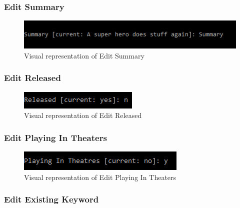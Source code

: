 \documentclass[
  english,
  a4paper,
,tablecaptionabove
]{scrartcl}
\begin{document}
\newpage

\hypertarget{edit-summary}{%
\subsubsection{Edit Summary}\label{edit-summary}}

\begin{figure}
\centering
\includegraphics{images/ui-screenshots/update-summary.png}
\caption{Visual representation of Edit Summary}
\end{figure}

\newpage

\hypertarget{edit-released}{%
\subsubsection{Edit Released}\label{edit-released}}

\begin{figure}
\centering
\includegraphics{images/ui-screenshots/update-released.png}
\caption{Visual representation of Edit Released}
\end{figure}

\newpage

\hypertarget{edit-playing-in-theaters}{%
\subsubsection{Edit Playing In
Theaters}\label{edit-playing-in-theaters}}

\begin{figure}
\centering
\includegraphics{images/ui-screenshots/update-playing-in-theatres.png}
\caption{Visual representation of Edit Playing In Theaters}
\end{figure}

\newpage

\hypertarget{edit-existing-keyword}{%
\subsubsection{Edit Existing Keyword}\label{edit-existing-keyword}}
\end{document}
